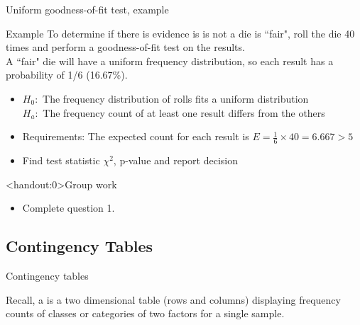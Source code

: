 \documentclass[xcolor=table]{beamer}
\begin{document}
\begin{frame}{Uniform goodness-of-fit test, example}
\begin{exampleblock}{Example}
\large
To determine if there is evidence is is not a die is ``fair", roll the die 40 times and perform a goodness-of-fit test on the results. \\
\medskip
A ``fair" die will have a uniform frequency distribution, so each result has a probability of 1/6 (16.67\%).
\medskip
\begin{itemize}
\pause\item $H_0:$ The frequency distribution of rolls fits a uniform distribution\\
$H_a:$ The frequency count of at least one result differs from the others

\pause\item Requirements: The expected count for each result is $E = \frac 1 6 \times 40 = 6.667 > 5$
\pause\item Find test statistic $\chi^2$, p-value and report decision
\end{itemize}
\end{exampleblock}
\end{frame}


\begin{frame}<handout:0>{Group work}
\begin{block}{}
\large
\begin{itemize}
\item Complete question 1.
\end{itemize}
\end{block}
\end{frame}


\subsection{Contingency Tables}

\begin{frame}{Contingency tables}
\begin{block}{}
\large
Recall, a  is a two dimensional table (rows and columns) displaying frequency counts of classes or categories of two factors for a single sample.
\end{block}
\end{frame}
\end{document}
